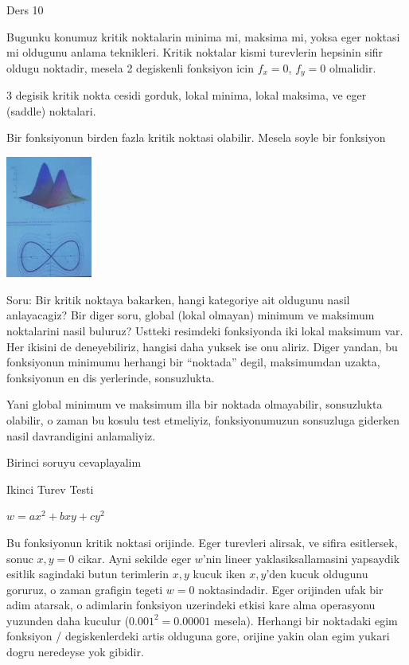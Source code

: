 \documentclass[12pt,fleqn]{article}\usepackage{../common}
\begin{document}
Ders 10

Bugunku konumuz kritik noktalarin minima mi, maksima mi, yoksa eger noktasi
mi oldugunu anlama teknikleri. Kritik noktalar kismi turevlerin hepsinin
sifir oldugu noktadir, mesela 2 degiskenli fonksiyon icin $f_x=0$, $f_y=0$
olmalidir. 

3 degisik kritik nokta cesidi gorduk, lokal minima, lokal maksima, ve
eger (saddle) noktalari. 

Bir fonksiyonun birden fazla kritik noktasi olabilir. Mesela soyle bir
fonksiyon

\includegraphics[height=4cm]{10_1.png}

Soru: Bir kritik noktaya bakarken, hangi kategoriye ait oldugunu nasil
anlayacagiz? Bir diger soru, global (lokal olmayan) minimum ve maksimum
noktalarini nasil buluruz?  Ustteki resimdeki fonksiyonda iki lokal
maksimum var. Her ikisini de deneyebiliriz, hangisi daha yuksek ise onu
aliriz. Diger yandan, bu fonksiyonun minimumu herhangi bir ``noktada'' degil,
maksimumdan uzakta, fonksiyonun en dis yerlerinde, sonsuzlukta. 

Yani global minimum ve maksimum illa bir noktada olmayabilir, sonsuzlukta
olabilir, o zaman bu kosulu test etmeliyiz, fonksiyonumuzun sonsuzluga
giderken nasil davrandigini anlamaliyiz.

Birinci soruyu cevaplayalim

Ikinci Turev Testi

$w = ax^2 + bxy + cy^2$

Bu fonksiyonun kritik noktasi orijinde. Eger turevleri alirsak, ve sifira
esitlersek, sonuc $x,y=0$ cikar. Ayni sekilde eger $w$'nin lineer
yaklasiksallamasini yapsaydik esitlik sagindaki butun terimlerin $x,y$
kucuk iken $x,y$'den kucuk oldugunu goruruz, o zaman grafigin tegeti $w=0$
noktasindadir. Eger orijinden ufak bir adim atarsak, o adimlarin fonksiyon
uzerindeki etkisi kare alma operasyonu yuzunden daha kuculur ($0.001^2 =
0.00001$ 
mesela). Herhangi bir noktadaki egim fonksiyon / degiskenlerdeki artis
olduguna gore, orijine yakin olan egim yukari dogru neredeyse yok gibidir. 
\end{document}
